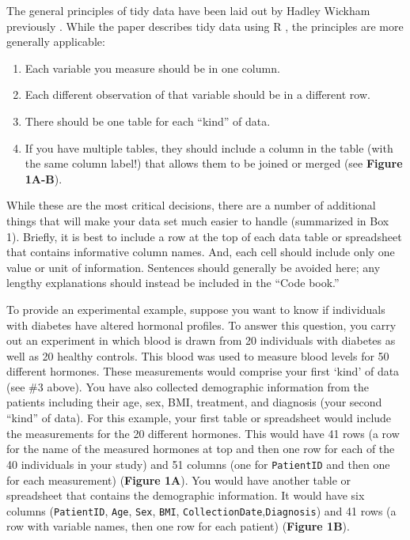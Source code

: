 \documentclass[12pt]{article}
\providecommand{\tightlist}{%
  \setlength{\itemsep}{0pt}\setlength{\parskip}{0pt}}
\begin{document}
The general principles of tidy data have been laid out by Hadley Wickham
previously \citep{_tidy_data}. While the paper describes tidy data using
R \citep{_r}, the principles are more generally applicable:

\begin{enumerate}
\def\labelenumi{\arabic{enumi}.}
\tightlist
\item
  Each variable you measure should be in one column.
\item
  Each different observation of that variable should be in a different
  row.
\item
  There should be one table for each ``kind'' of data.
\item
  If you have multiple tables, they should include a column in the table
  (with the same column label!) that allows them to be joined or merged
  (see \textbf{Figure 1A-B}).
\end{enumerate}

While these are the most critical decisions, there are a number of
additional things that will make your data set much easier to handle
\citep{_data_org} (summarized in Box 1). Briefly, it is best to include
a row at the top of each data table or spreadsheet that contains
informative column names. And, each cell should include only one value
or unit of information. Sentences should generally be avoided here; any
lengthy explanations should instead be included in the ``Code book.''

To provide an experimental example, suppose you want to know if
individuals with diabetes have altered hormonal profiles. To answer this
question, you carry out an experiment in which blood is drawn from 20
individuals with diabetes as well as 20 healthy controls. This blood was
used to measure blood levels for 50 different hormones. These
measurements would comprise your first `kind' of data (see \#3 above).
You have also collected demographic information from the patients
including their age, sex, BMI, treatment, and diagnosis (your second
``kind'' of data). For this example, your first table or spreadsheet
would include the measurements for the 20 different hormones. This would
have 41 rows (a row for the name of the measured hormones at top and
then one row for each of the 40 individuals in your study) and 51
columns (one for \texttt{PatientID} and then one for each measurement)
(\textbf{Figure 1A}). You would have another table or spreadsheet that
contains the demographic information. It would have six columns
(\texttt{PatientID}, \texttt{Age}, \texttt{Sex}, \texttt{BMI},
\texttt{CollectionDate},\texttt{Diagnosis}) and 41 rows (a row with
variable names, then one row for each patient) (\textbf{Figure 1B}).
\end{document}
